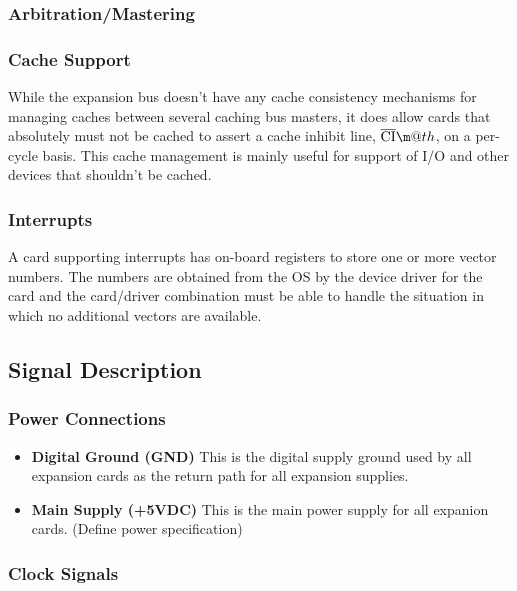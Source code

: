 \documentclass{article}
\makeatletter
\newcommand*{\textoverline}[1]{$\overline{\hbox{#1}}\m@th$}
\makeatother
\begin{document}
\subsubsection{Arbitration/Mastering}

\subsubsection{Cache Support}

While the expansion bus doesn't have any cache consistency mechanisms for
managing caches between several caching bus masters, it does allow cards that
absolutely must not be cached to assert a cache inhibit line,
\textoverline{CI}, on a per-cycle basis. This cache management is mainly useful
for support of I/O and other devices that shouldn't be cached.

\subsubsection{Interrupts}

A card supporting interrupts has on-board registers to store one or more vector
numbers. The numbers are obtained from the OS by the device driver for the card
and the card/driver combination must be able to handle the situation in which no
additional vectors are available.

\subsection{Signal Description}

\subsubsection{Power Connections}

\begin{itemize}
	\item{\textbf{Digital Ground (GND)}} This is the digital supply ground
	used by all expansion cards as the return path for all expansion
	supplies.

	\item{\textbf{Main Supply (+5VDC)}} This is the main power supply for
	all expanion cards. (Define power specification)

\end{itemize}

\subsubsection{Clock Signals}
\end{document}
